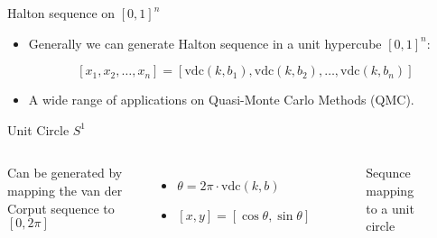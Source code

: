 \documentclass[10pt,ignorenonframetext,serif,onlymath]{beamer}
\begin{document}
\begin{frame}{Halton sequence on \([0,1]^n\)}
\protect\hypertarget{halton-sequence-on-01n}{}

\begin{itemize}
\item
  Generally we can generate Halton sequence in a unit hypercube
  \([0,1]^n\):

  \[[x_1, x_2, \ldots, x_n] = [\mathrm{vdc}(k,b_1), \mathrm{vdc}(k,b_2), \ldots, \mathrm{vdc}(k,b_n)]\]
\item
  A wide range of applications on Quasi-Monte Carlo Methods (QMC).
\end{itemize}

\end{frame}

\begin{frame}{Unit Circle \(S^1\)}
\protect\hypertarget{unit-circle-s1}{}

\begin{columns}


Can be generated by mapping the van der Corput sequence to \([0, 2\pi]\)

\begin{itemize}
\item
  \(\theta = 2\pi \cdot \mathrm{vdc}(k,b)\)
\item
  \([x, y] = [\cos\theta, \sin\theta]\)
\end{itemize}


\begin{figure}[hp]
\centering

\caption{Sequnce mapping to a unit circle}%
\label{fig:circle}
\end{figure}

\end{columns}

\end{frame}
\end{document}
